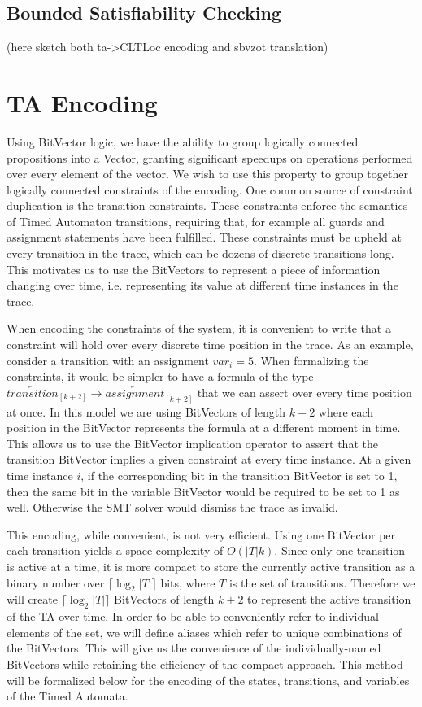 \documentclass[a4paper,12pt]{article}
\begin{document}
\subsection{Bounded Satisfiability Checking}
\label{sec:orgae5346c}
(here sketch both ta->CLTLoc encoding and sbvzot translation)
\section{TA Encoding}
\label{sec:org3d1f0c9}
Using BitVector logic, we have the ability to group logically connected
propositions into a Vector, granting significant speedups on operations
performed over every element of the vector. We wish to use this property to
group together logically connected constraints of the encoding. One common
source of constraint duplication is the transition constraints. These
constraints enforce the semantics of Timed Automaton transitions, requiring
that, for example all guards and assignment statements have been fulfilled.
These constraints must be upheld at every transition in the trace, which can be
dozens of discrete transitions long. This motivates us to use the BitVectors to
represent a piece of information changing over time, i.e. representing its value
at different time instances in the trace.

When encoding the constraints of the system, it is convenient to write that a
constraint will hold over every discrete time position in the trace. As an
example, consider a transition with an assignment \(var_i = 5\). When
formalizing the constraints, it would be simpler to have a formula of the type
\(\overleftarrow{transition}_{[k+2]} \rightarrow
\overleftarrow{assignment}_{[k+2]}\) that we can assert over every time position
at once. In this model we are using BitVectors of length \(k+2\) where each
position in the BitVector represents the formula at a different moment in time.
This allows us to use the BitVector implication operator to assert that the
transition BitVector implies a given constraint at every time instance. At a
given time instance \(i\), if the corresponding bit in the transition BitVector
is set to 1, then the same bit in the variable BitVector would be required to be
set to 1 as well. Otherwise the SMT solver would dismiss the trace as invalid.

This encoding, while convenient, is not very efficient. Using one BitVector per
each transition yields a space complexity of \(O(|T|k)\). Since only one
transition is active at a time, it is more compact to store the currently active
transition as a binary number over \(\lceil\log_2 |T|\rceil\) bits, where \(T\)
is the set of transitions. Therefore we will create \(\lceil\log_2 |T|\rceil\)
BitVectors of length \(k+2\) to represent the active transition of the TA over
time. In order to be able to conveniently refer to individual elements of the
set, we will define aliases which refer to unique combinations of the
BitVectors. This will give us the convenience of the individually-named BitVectors
while retaining the efficiency of the compact approach. This method will be
formalized below for the encoding of the states, transitions, and variables of
the Timed Automata.
\end{document}
